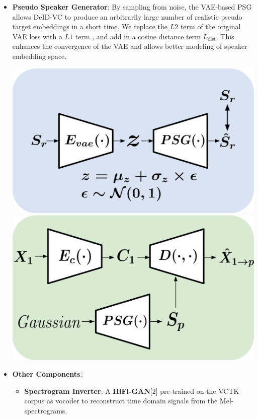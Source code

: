 \documentclass[20pt,margin=1in,innermargin=-4.5in,blockverticalspace=-0.25in]{tikzposter}
\begin{document}
\begin{columns}
{\begin{itemize}
     	    \item \textbf{Pseudo Speaker Generator}: By sampling from noise, the VAE-based PSG allows DeID-VC to produce an arbitrarily large number of realistic pseudo target embeddings in a short time. We replace the $L2$ term of the original VAE loss with a $L1$ term , and add in a cosine distance term $L_{\text{dist}}$. This enhances the convergence of the VAE and allows better modeling of speaker embedding space.
            \begin{tikzfigure}
    			\includegraphics[scale=0.3]{./psg_train.png}
    			\includegraphics[scale=0.3]{./psg_infer.png}
    		\end{tikzfigure}
			
			\item \textbf{Other Components}: 
			\begin{itemize}
    			\item \textbf{Spectrogram Inverter}: A \textbf{HiFi-GAN}[2] pre-trained on the VCTK corpus as vocoder
    			to reconstruct time domain signals from the Mel-spectrograms.
    

\end{itemize}
\end{itemize}}
\end{columns}
\end{document}
